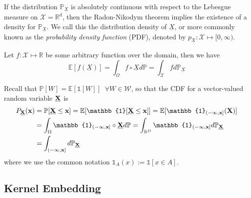 \documentclass[twoside]{article} \usepackage{aistats2017}
\theoremstyle{definition}
\theoremstyle{remark}
\newcommand{\rv}[1]{\underline{#1}}
\begin{document}
		
		If the distribution $\mathbb{P}_{\rv{X}}$ is absolutely continuous with respect to the Lebesgue measure on $\mathcal{X} = \mathbb{R}^{d}$, then the Radon-Nikodym theorem implies the existence of a density for $\mathbb{P}_{\rv{X}}$. We call this the distribution density of $\rv{X}$, or more commonly known as the \textit{probability density function} (PDF), denoted by $p_{\rv{X}}: \mathcal{X} \mapsto [0, \infty)$.
		
		Let $f : \mathcal{X} \mapsto \mathbb{R}$ be some arbitrary function over the domain, then we have
		\begin{equation}
			\mathbb{E}[f(\rv{X})] = \int_{\Omega} f \circ \rv{X} d \mathbb{P} = \int_{\mathcal{X}} f d \mathbb{P}_{\rv{X}}
		\label{eq:functional_expectation}
		\end{equation}
		
		Recall that $\mathbb{P}[W] = \mathbb{E}[\mathbb{1}[W]] \;\; \forall W \in \mathcal{W}$, so that the CDF for a vector-valued random variable $\bvec{\rv{X}}$ is
		\begin{equation}
			\begin{aligned}
				P_{\bvec{\rv{X}}}(\bvec{x}) &= \mathbb{P}[\bvec{\rv{X}} \leq \bvec{x}] = \mathbb{E}[\mathbb{1}[\bvec{\rv{X}} \leq \bvec{x}]] = \mathbb{E}[\mathbb{1}_{(-\bvec{\infty}, \bvec{x}]}(\bvec{X})] \\
				&= \int_{\Omega} \mathbb{1}_{(-\bvec{\infty}, \bvec{x}]} \circ \bvec{\rv{X}} d \mathbb{P} = \int_{\mathbb{R}^{D}} \mathbb{1}_{(-\bvec{\infty}, \bvec{x}]} d \mathbb{P}_{\bvec{\rv{X}}} \\
				&= \int_{(-\bvec{\infty}, \bvec{x}]} d \mathbb{P}_{\bvec{\rv{X}}}
			\end{aligned}
		\label{eq:cdf_integral}
		\end{equation}
		where we use the common notation $\mathbb{1}_{A}(x) := \mathbb{1}[x \in A]$.
		
	\subsection{Kernel Embedding}
	\label{sec:background:kernel_embedding}
	
\end{document}
